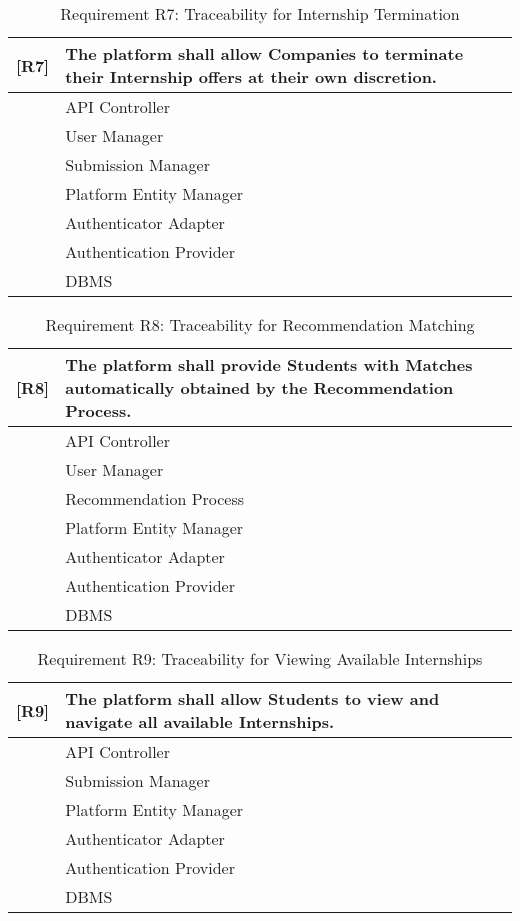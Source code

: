 \begin{table}[H]
    \centering
    \begin{tabular}{|p{1cm}|p{14cm}|}
    \hline
    \textbf{[R7]} & \textbf{The platform shall allow Companies to terminate their Internship offers at their own discretion.} \\ \hline
    [C1] & API Controller \\ \hline
    [C3] & User Manager \\ \hline
    [C5] & Submission Manager \\ \hline
    [C10] & Platform Entity Manager \\ \hline
    [C11] & Authenticator Adapter \\ \hline
    [E3] & Authentication Provider \\ \hline
    [E4] & DBMS \\ \hline
    \end{tabular}
    \caption{Requirement R7: Traceability for Internship Termination}
    \label{tab:RT7}
\end{table}

\begin{table}[H]
    \centering
    \begin{tabular}{|p{1cm}|p{14cm}|}
    \hline
    \textbf{[R8]} & \textbf{The platform shall provide Students with Matches automatically obtained by the Recommendation Process.} \\ \hline
    [C1] & API Controller \\ \hline
    [C3] & User Manager \\ \hline
    [C4] & Recommendation Process \\ \hline
    [C10] & Platform Entity Manager \\ \hline
    [C11] & Authenticator Adapter \\ \hline
    [E3] & Authentication Provider \\ \hline
    [E4] & DBMS \\ \hline
    \end{tabular}
    \caption{Requirement R8: Traceability for Recommendation Matching}
    \label{tab:RT8}
\end{table}

\begin{table}[H]
    \centering
    \begin{tabular}{|p{1cm}|p{14cm}|}
    \hline
    \textbf{[R9]} & \textbf{The platform shall allow Students to view and navigate all available Internships.} \\ \hline
    [C1] & API Controller \\ \hline
    [C5] & Submission Manager \\ \hline
    [C10] & Platform Entity Manager \\ \hline
    [C11] & Authenticator Adapter \\ \hline
    [E3] & Authentication Provider \\ \hline
    [E4] & DBMS \\ \hline
    \end{tabular}
    \caption{Requirement R9: Traceability for Viewing Available Internships}
    \label{tab:RT9}
\end{table}

